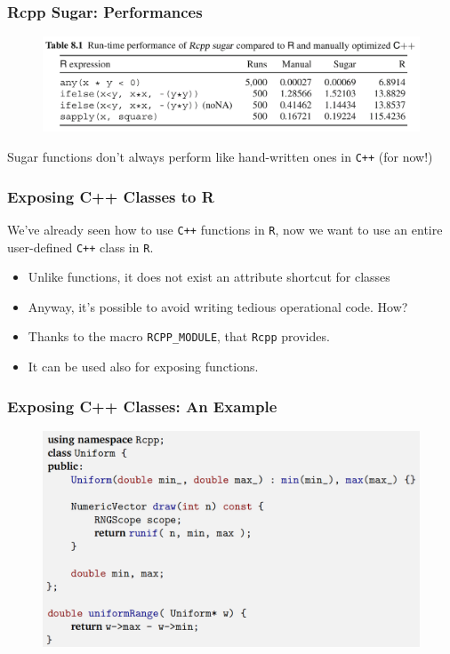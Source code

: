 \documentclass{beamer}
\def\code#1{\texttt{#1}} %
\begin{document}
\begin{frame}
\frametitle{Rcpp Sugar: Performances}

\begin{figure}[s3]
    \includegraphics[width=1\textwidth]{sugar_hand_r.png}
\end{figure}

Sugar functions don't always perform like hand-written ones in \code{C++} (for now!)

\end{frame}


\begin{frame}
\frametitle{Exposing C++ Classes to R}
We've already seen how to use \code{C++} functions in \code{R}, now we want to 
use an entire user-defined \code{C++} class in \code{R}.

\begin{itemize}
    \item<1-> Unlike functions, it does not exist an attribute shortcut for classes
    \item<2-> Anyway, it's possible to avoid writing tedious operational code. How?
    \item<3-> Thanks to the macro \code{RCPP\_MODULE}, that \code{Rcpp} provides.
    \item<4-> It can be used also for exposing functions.
    
\end{itemize}
\end{frame}


\begin{frame}
\frametitle{Exposing C++ Classes: An Example}

\begin{figure}[s2]
    \includegraphics[width=1\textwidth]{exposing_classes_1.png}
\end{figure}
\end{frame}
\end{document}

